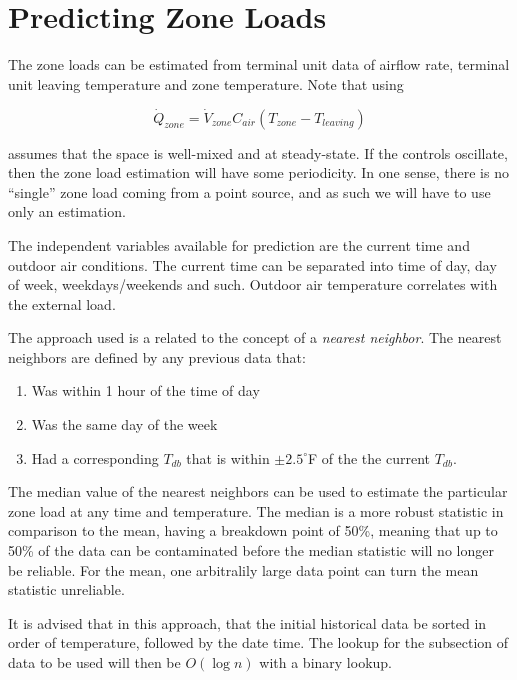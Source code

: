 \section{Predicting Zone Loads}

The zone loads can be estimated from terminal unit data of airflow rate, terminal unit leaving temperature and zone temperature. Note that using 

\begin{equation}
\dot Q_{zone} = \dot V_{zone} C_{air} \left(T_{zone}-T_{leaving} \right)
\end{equation}

assumes that the space is well-mixed and at steady-state. If the controls oscillate, then the zone load estimation will have some periodicity. In one sense, there is no ``single'' zone load coming from a point source, and as such we will have to use only an estimation.

The independent variables available for prediction are the current time and outdoor air conditions. The current time can be separated into time of day, day of week, weekdays/weekends and such. Outdoor air temperature correlates with the external load. 

The approach used is a related to the concept of a \textit{nearest neighbor}. The nearest neighbors are defined by any previous data that:

\begin{enumerate}
\item Was within 1 hour of the time of day 
\item Was the same day of the week
\item Had a corresponding \(T_{db}\) that is within \(\pm 2.5^\circ\)F of the the current \(T_{db}\). 
\end{enumerate}

The median value of the nearest neighbors can be used to estimate the particular zone load at any time and temperature.  The median is a more robust statistic in comparison to the mean, having a breakdown point of 50\%, meaning that up to 50\% of the data can be contaminated before the median statistic will no longer be reliable. For the mean, one arbitralily large data point can turn the mean statistic unreliable. 

It is advised that in this approach, that the initial historical data be sorted in order of temperature, followed by the date time.  The lookup for the subsection of data to be used will then be \(O\left(\log n \right)\) with a binary lookup. 

